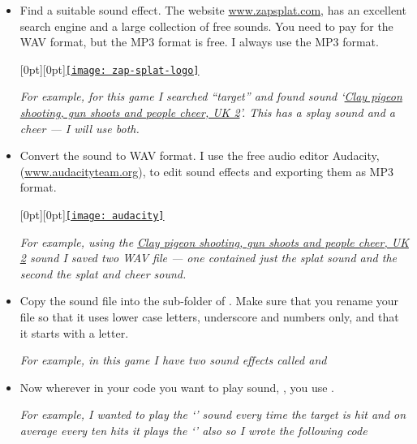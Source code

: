 \documentclass{coderdojo}
\begin{document}
\begin{itemize}
\item \parbox[t]{12cm}{Find a suitable sound effect.  The website
\href{https://www.zapsplat.com}{www.zapsplat.com}, has an excellent search engine and a large collection of free sounds. You need to pay for the WAV format, but the MP3 format is free. I always use the MP3 format.}
\hfill\raisebox{-32pt}[0pt][0pt]{\href{https://www.zapsplat.com}{\texttt{[image: zap-splat-logo]}}}

\vspace{6pt}
{\em\smaller For example, for this game I searched ``target'' and found sound `\href{https://www.zapsplat.com/music/clay-pigeon-shooting-thrower-machine-release-clay-gun-shoots-and-people-cheer-uk-2/}{Clay pigeon shooting, gun shoots and people cheer, UK 2}'. This has a splay sound and a cheer --- I will use both.} 

\item \parbox[t]{13cm}{ 
Convert the sound to WAV format. I use the free audio editor Audacity,
(\href{https://www.audacityteam.org}{www.audacityteam.org}), to edit sound effects and exporting them as MP3 format.}
\hfill\raisebox{-32pt}[0pt][0pt]{\href{https://www.audacityteam.org}{\texttt{[image: audacity]}}}

\vspace{6pt}
{\em\smaller For example, using the \href{https://www.zapsplat.com/music/clay-pigeon-shooting-thrower-machine-release-clay-gun-shoots-and-people-cheer-uk-2/}{Clay pigeon shooting, gun shoots and people cheer, UK 2} sound I saved two WAV file --- one contained just the splat sound and the second the splat and cheer sound.
} 

\item 
Copy the sound file into the  sub-folder of . Make sure that you rename your file so that it uses lower case letters, underscore and numbers only, and that it starts with a letter.

 \vspace{6pt}
{\em\smaller For example, in this game I have two sound effects called 
 and }

\item
Now wherever in your code you want to play sound, , you use . 

 \vspace{6pt}
{\em\smaller For example, I wanted to play the `' sound every time the target is hit and on average every ten hits it plays the `' also so I wrote the following code}

\end{itemize}
\end{document}
